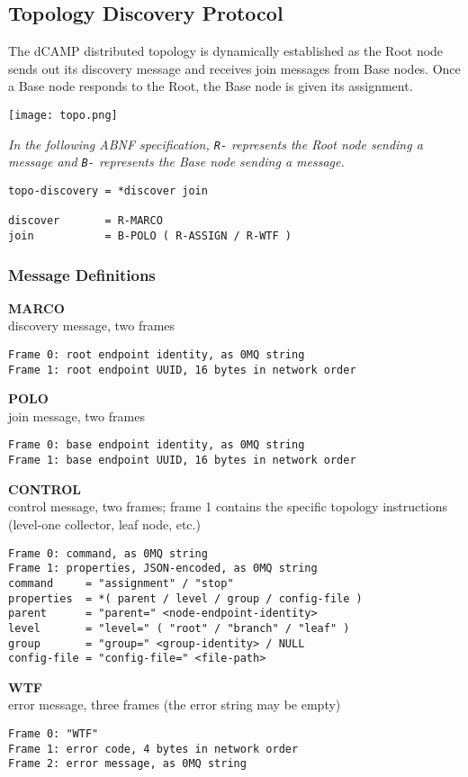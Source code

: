 \subsection{Topology Discovery Protocol}

The dCAMP distributed topology is dynamically established as the Root node sends out its discovery message and receives
join messages from Base nodes. Once a Base node responds to the Root, the Base node is given its assignment.

\texttt{[image: topo.png]}

\textit{In the following ABNF specification, \texttt{R-} represents the Root node sending a message and \texttt{B-}
represents the Base node sending a message.}

\begin{lstlisting}
topo-discovery = *discover join

discover       = R-MARCO
join           = B-POLO ( R-ASSIGN / R-WTF )
\end{lstlisting}

\subsubsection{Message Definitions}

\textbf{MARCO} \\
discovery message, two frames

\begin{lstlisting}
Frame 0: root endpoint identity, as 0MQ string
Frame 1: root endpoint UUID, 16 bytes in network order
\end{lstlisting}

\textbf{POLO} \\
join message, two frames

\begin{lstlisting}
Frame 0: base endpoint identity, as 0MQ string
Frame 1: base endpoint UUID, 16 bytes in network order
\end{lstlisting}

\textbf{CONTROL} \\
control message, two frames; frame 1 contains the specific topology instructions (level-one collector, leaf node, etc.)

\begin{lstlisting}
Frame 0: command, as 0MQ string
Frame 1: properties, JSON-encoded, as 0MQ string
command     = "assignment" / "stop"
properties  = *( parent / level / group / config-file )
parent      = "parent=" <node-endpoint-identity>
level       = "level=" ( "root" / "branch" / "leaf" )
group       = "group=" <group-identity> / NULL
config-file = "config-file=" <file-path>
\end{lstlisting}

\textbf{WTF} \\
error message, three frames (the error string may be empty)

\begin{lstlisting}
Frame 0: "WTF"
Frame 1: error code, 4 bytes in network order
Frame 2: error message, as 0MQ string
\end{lstlisting}
